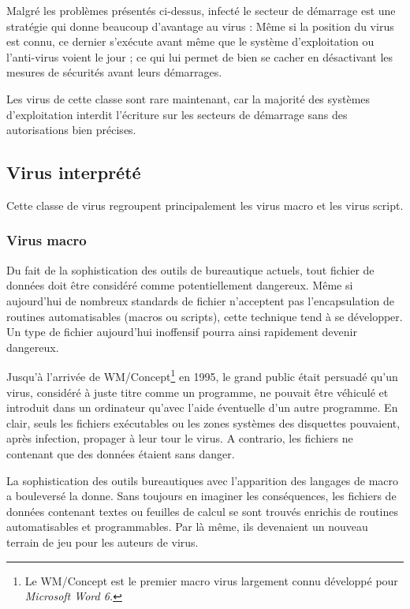     Malgré les problèmes présentés ci-dessus, infecté le secteur de démarrage est une stratégie qui donne beaucoup
    d'avantage au virus : Même si la position du virus est connu, ce dernier s'exécute avant même que le système 
    d'exploitation ou l'anti-virus voient le jour ; ce qui lui permet de bien se cacher en désactivant les mesures 
    de sécurités avant leurs démarrages.

    Les virus de cette classe sont rare maintenant, car la majorité des systèmes d'exploitation interdit l'écriture
    sur les secteurs de démarrage sans des autorisations bien précises.

    \subsection{Virus interprété}
    Cette classe de virus regroupent principalement les virus macro et les virus script.
        \subsubsection{Virus macro}
        Du fait de la sophistication des outils de bureautique actuels, tout fichier de données doit être 
        considéré comme potentiellement dangereux. Même si aujourd’hui de nombreux standards de fichier 
        n’acceptent pas l’encapsulation de routines automatisables (macros ou scripts), 
        cette technique tend à se développer. Un type de fichier aujourd’hui inoffensif pourra ainsi 
        rapidement devenir dangereux.

        Jusqu’à l’arrivée de WM/Concept\footnote{Le WM/Concept est le premier macro virus largement connu
        développé pour \emph{Microsoft Word 6.}} en 1995, le grand public était persuadé qu’un virus, 
        considéré à juste titre comme un programme, ne pouvait être véhiculé et introduit dans un ordinateur 
        qu’avec l'aide éventuelle d’un autre programme. En clair, seuls les fichiers exécutables ou les zones 
        systèmes des disquettes pouvaient, après infection, propager à leur tour le virus. 
        A contrario, les fichiers ne contenant que des données étaient sans danger.

        La sophistication des outils bureautiques avec l’apparition des langages de macro a bouleversé 
        la donne. Sans toujours en imaginer les conséquences, les fichiers de données contenant textes ou feuilles 
        de calcul se sont trouvés enrichis de routines automatisables et programmables. 
        Par là même, ils devenaient un nouveau terrain de jeu pour les auteurs de virus.

